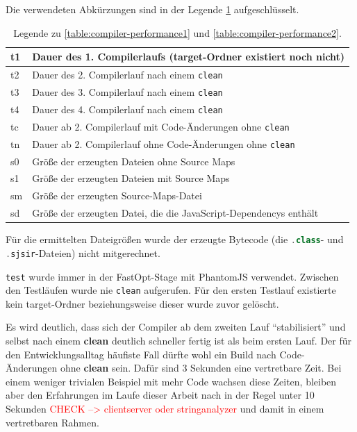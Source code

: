 \documentclass[a4paper, 12pt, hidelinks, listof=totoc, listoftables=totoc, bibliography=totoc]{scrreprt}
\newcommand{\code}[1]{\lstinline[language=Scala, style=inline]|#1|}
\newcommand{\TODO}[1]{\textcolor{red}{#1}\newline}
\begin{document}
\medskip

Die verwendeten Abkürzungen sind in der Legende \ref{table:compiler-performance-legend} aufgeschlüsselt.

\medskip

\begin{table}[!h]
\begin{tabular}{|l|l|}
\hline t1 & Dauer des 1. Compilerlaufs (target-Ordner existiert noch nicht) \\ 
\hline t2 & Dauer des 2. Compilerlauf nach einem \code{clean} \\ 
\hline t3 & Dauer des 3. Compilerlauf nach einem \code{clean} \\ 
\hline t4 & Dauer des 4. Compilerlauf nach einem \code{clean} \\ 
\hline tc & Dauer ab 2. Compilerlauf mit Code-Änderungen ohne \code{clean} \\ 
\hline tn & Dauer ab 2. Compilerlauf ohne Code-Änderungen ohne \code{clean} \\ 
\hline s0 & Größe der erzeugten Dateien ohne Source Maps \\ 
\hline s1 & Größe der erzeugten Dateien mit Source Maps \\ 
\hline sm & Größe der erzeugten Source-Maps-Datei \\ 
\hline sd & Größe der erzeugten Datei, die die JavaScript-Dependencys enthält \\ 
\hline 
\end{tabular} 
\caption{Legende zu \ref{table:compiler-performance1} und \ref{table:compiler-performance2}.}
\label{table:compiler-performance-legend}
\end{table}

\medskip

Für die ermittelten Dateigrößen wurde der erzeugte Bytecode (die \code{.class}- und \code{.sjsir}-Dateien) nicht mitgerechnet.

\code{test} wurde immer in der FastOpt-Stage mit PhantomJS verwendet. Zwischen den Testläufen wurde nie \code{clean} aufgerufen. Für den ersten Testlauf existierte kein target-Ordner beziehungsweise dieser wurde zuvor gelöscht.

Es wird deutlich, dass sich der Compiler ab dem zweiten Lauf "`stabilisiert"' und selbst nach einem \textbf{clean} deutlich schneller fertig ist als beim ersten Lauf. Der für den Entwicklungsalltag häufiste Fall dürfte wohl ein Build nach Code-Änderungen ohne \textbf{clean} sein. Dafür sind 3 Sekunden eine vertretbare Zeit. Bei einem weniger trivialen Beispiel mit mehr Code wachsen diese Zeiten, bleiben aber den Erfahrungen im Laufe dieser Arbeit nach in der Regel unter 10 Sekunden \TODO{CHECK --> clientserver oder stringanalyzer} und damit in einem vertretbaren Rahmen.
\end{document}
